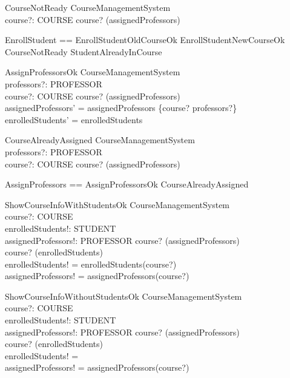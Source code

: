 \begin{schema}{CourseNotReady}
\Xi CourseManagementSystem \\
course?: COURSE
\where
    course? \notin \dom(assignedProfessors)
\end{schema}

\begin{zed}
    EnrollStudent == EnrollStudentOldCourseOk \lor EnrollStudentNewCourseOk \lor CourseNotReady \lor StudentAlreadyInCourse
\end{zed}

\begin{schema}{AssignProfessorsOk}
    \Delta CourseManagementSystem \\
    professors?: \power PROFESSOR \\
    course?: COURSE
    \where
    course? \notin \dom(assignedProfessors) \\
    assignedProfessors' = assignedProfessors \cup \{course? \mapsto professors?\} \\
    enrolledStudents' = enrolledStudents
\end{schema}

\begin{schema}{CourseAlreadyAssigned}
    \Xi CourseManagementSystem \\
    professors?: \power PROFESSOR \\
    course?: COURSE
    \where
    course? \in \dom(assignedProfessors)
\end{schema}

\begin{zed}
    AssignProfessors == AssignProfessorsOk \lor CourseAlreadyAssigned
\end{zed}

\begin{schema}{ShowCourseInfoWithStudentsOk}
    \Xi CourseManagementSystem \\
    course?: COURSE \\
    enrolledStudents!: \power STUDENT \\
    assignedProfessors!: \power PROFESSOR
    \where
    course? \in \dom(assignedProfessors) \\
    course? \in \dom(enrolledStudents) \\
    enrolledStudents! = enrolledStudents(course?) \\
    assignedProfessors! = assignedProfessors(course?)
\end{schema}

\begin{schema}{ShowCourseInfoWithoutStudentsOk}
    \Xi CourseManagementSystem \\
    course?: COURSE \\
    enrolledStudents!: \power STUDENT \\
    assignedProfessors!: \power PROFESSOR
    \where
    course? \in \dom(assignedProfessors) \\
    course? \notin \dom(enrolledStudents) \\
    enrolledStudents! = \emptyset \\
    assignedProfessors! = assignedProfessors(course?)
\end{schema}


